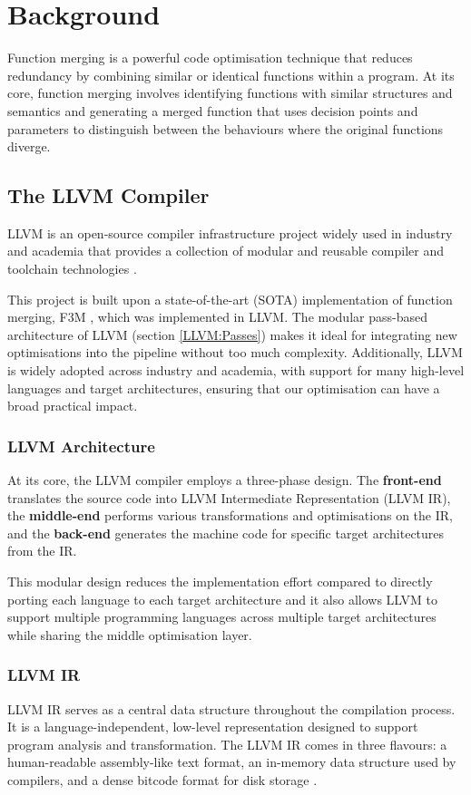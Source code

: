 \chapter{Background}
Function merging is a powerful code optimisation technique that reduces redundancy by combining similar or identical functions within a program. At its core, function merging involves identifying functions with similar structures and semantics and generating a merged function that uses decision points and parameters to distinguish between the behaviours where the original functions diverge.

\section{The LLVM Compiler} \label{Background:LLVM}
LLVM is an open-source compiler infrastructure project widely used in industry and academia that provides a collection of modular and reusable compiler and toolchain technologies \cite{LLVMMainPage}. 

This project is built upon a state-of-the-art (SOTA) implementation of function merging, F3M \cite{F3M:FastFocusedFunctionMerging},  which was implemented in LLVM. The modular pass-based architecture of LLVM (section \ref{LLVM:Passes}) makes it ideal for integrating new optimisations into the pipeline without too much complexity. Additionally, LLVM is widely adopted across industry and academia, with support for many high-level languages and target architectures, ensuring that our optimisation can have a broad practical impact.

\subsection{LLVM Architecture}
At its core, the LLVM compiler employs a three-phase design. The \textbf{front-end} translates the source code into LLVM Intermediate Representation (LLVM IR), the \textbf{middle-end} performs various transformations and optimisations on the IR, and the \textbf{back-end} generates the machine code for specific target architectures from the IR.

This modular design reduces the implementation effort compared to directly porting each language to each target architecture and it also allows LLVM to support multiple programming languages across multiple target architectures while sharing the middle optimisation layer.

\subsection{LLVM IR} \label{LLVM:IR} \label{LLVM:Bitcode}
LLVM IR serves as a central data structure throughout the compilation process. It is a language-independent, low-level representation designed to support program analysis and transformation. The LLVM IR comes in three flavours: a human-readable assembly-like text format, an in-memory data structure used by compilers, and a dense bitcode format for disk storage \cite{LLVMIR}. 

